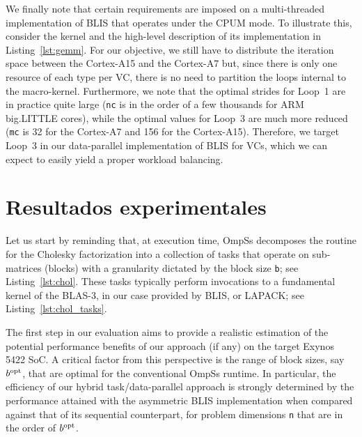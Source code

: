 We finally note that certain requirements are imposed on a multi-threaded implementation of BLIS that operates under the 
CPUM mode. 
To illustrate this, consider the \gemm kernel and the high-level description of its implementation
in Listing~\ref{lst:gemm}. For our objective,
we still have to distribute the iteration space between the Cortex-A15 and the Cortex-A7 but, since there is only one resource of each type per VC,
there is no need to partition the loops internal to the macro-kernel. 
Furthermore, we note that the optimal strides for Loop~1 are in practice quite
large ({\tt nc} is in the order of a few thousands for ARM big.LITTLE cores), while the optimal values for Loop~3 are much more reduced
({\tt mc} is 32 for the Cortex-A7 and 156 for the Cortex-A15). Therefore, we target Loop~3 in our data-parallel implementation of BLIS for
VCs, which we can expect to easily yield a proper workload balancing.


\section{Resultados experimentales}

Let us start by reminding that, at execution time, OmpSs decomposes the routine for the Cholesky factorization into a collection of tasks 
that operate on sub-matrices (blocks) with a granularity 
dictated by the block size {\tt b}; see Listing~\ref{lst:chol}. 
These tasks typically perform invocations to a fundamental kernel of the BLAS-3, 
in our case provided by BLIS, or LAPACK; see Listing~\ref{lst:chol_tasks}.  

\newcommand{\bopt}{b^{\mbox{\rm \scriptsize opt}}\xspace}

The first step in our evaluation aims to provide a realistic estimation of the potential performance benefits
of our approach (if any) on the target Exynos 5422 SoC. 
A critical factor from this perspective is the range of block sizes, say $\bopt$,
that are optimal for the conventional OmpSs runtime. In particular, the efficiency 
of our hybrid task/data-parallel approach is strongly determined by the performance 
attained with the asymmetric BLIS implementation when compared against that of its sequential counterpart,
for problem dimensions {\tt n} that are in the order of $\bopt$.

